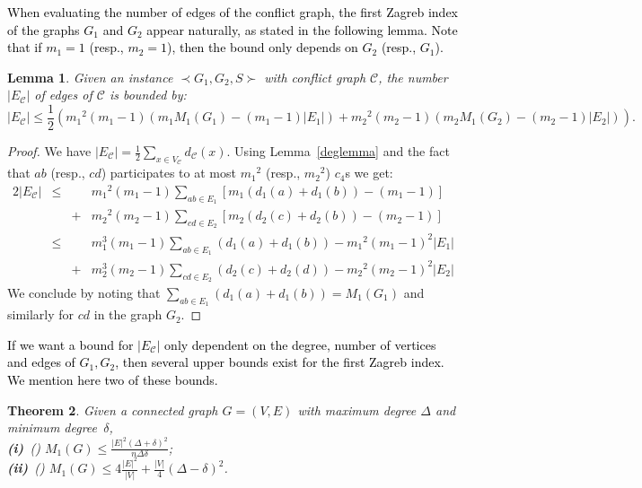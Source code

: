 \documentclass[final]{dmtcs-episciences}
\newtheorem{theorem}{Theorem}
\newtheorem{lemma}[theorem]{Lemma}
\newcommand\mar[1]{\textcolor{black}{#1}}
\begin{document}
\mar{When evaluating the number of edges of the conflict graph, the first Zagreb index of the graphs $G_1$ and $G_2$ appear naturally, as stated in the following lemma. Note that if $m_1=1$ (resp., $m_2=1$), then the bound only depends on $G_2$ (resp., $G_1$).} 


\begin{lemma}
\label{edgelemma}
Given an instance $\prec G_1,G_2,S \succ$ with conflict graph $\mathcal{C}$, the number $|E_\mathcal{C}|$ of edges of $\mathcal{C}$ is bounded by: 
$$|E_\mathcal{C}|\leq  \frac{1}{2}\left ({m_1}^2(m_1-1)\left (m_1M_1(G_1)-(m_1-1)|E_1|\right )+ {m_2}^2(m_2-1)\left (m_2M_1(G_2)-(m_2-1)|E_2|\right )\right ).$$
\end{lemma}
\begin{proof}
We have $|E_\mathcal{C}|=\frac{1}{2}\sum_{x\in V_{\mathcal{C}}}d_{\mathcal{C}}(x)$.
Using Lemma~\ref{deglemma} and the fact that $ab$ (resp., $cd$) participates to at most ${m_1}^2$ (resp., ${m_2}^2$) $c_4$s we get:
\begin{equation}\label{eq:edges}
\begin{array}{rccl}
2|E_\mathcal{C}|&\leq & &
{m_1}^2(m_1-1)\sum\limits_{ab\in E_1}[m_1(d_1(a)+d_1(b))-(m_1-1)]\\
&&+& {m_2}^2(m_2-1)\sum\limits_{cd\in E_2}[m_2(d_2(c)+d_2(b))-(m_2-1)]\\
&\leq && m_1^3(m_1-1)\sum\limits_{ab\in E_1}(d_1(a)+d_1(b))-{m_1}^2(m_1-1)^2|E_1|\\ 
&&+& m_2^3(m_2-1)\sum\limits_{cd\in E_2}(d_2(c)+d_2(d))-{m_2}^2(m_2-1)^2|E_2|
\end{array}
\end{equation}
We conclude by noting that  $\sum_{ab\in E_1}(d_1(a)+d_1(b))=M_1(G_1)$  and similarly for $cd$ in the graph $G_2$. \end{proof}

\mar{If we want a bound for $|E_\mathcal{C}|$ only dependent on the degree, number of vertices and edges of $G_1, G_2$, then  several upper bounds exist for the first Zagreb index.  We mention here two of these bounds.}

\begin{theorem}\label{th:zagreb-bound} Given a connected graph $G=(V,E)$ with maximum degree $\Delta$ and minimum degree~$\delta$,\\
\textbf{ (i)}~(\citet{Zagreb-Liu}) $M_1(G)\leq \frac{|E|^2(\Delta+\delta)^2}{n\Delta \delta}$;\\
\textbf{ (ii)}~(\citet{Zagreb-Tabar})
$M_1(G)\leq 4\frac{|E|^2}{|V|}+ \frac{|V|}{4}(\Delta-\delta)^2$.
\end{theorem}
\end{document}
